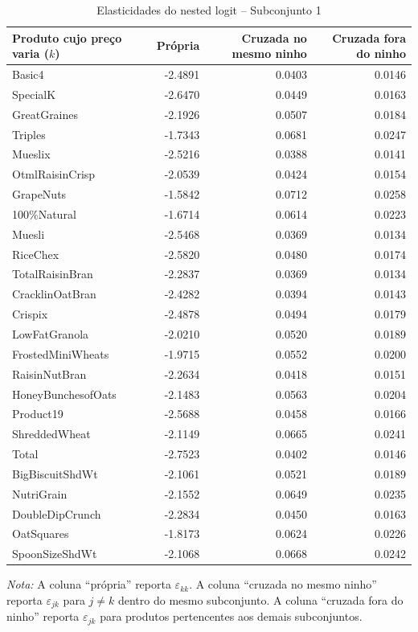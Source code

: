 \begingroup
\begin{table}[H]
\centering
\caption{Elasticidades do nested logit -- Subconjunto 1}
\label{tab:elas-nested-subset-1}
\scriptsize
\begin{tabular}{lrrr}
\toprule
Produto cujo preço varia ($k$) 
& Própria 
& Cruzada no mesmo ninho 
& Cruzada fora do ninho \\
\midrule
Basic4 & -2.4891 & 0.0403 & 0.0146 \\
SpecialK & -2.6470 & 0.0449 & 0.0163 \\
GreatGraines & -2.1926 & 0.0507 & 0.0184 \\
Triples & -1.7343 & 0.0681 & 0.0247 \\
Mueslix & -2.5216 & 0.0388 & 0.0141 \\
OtmlRaisinCrisp & -2.0539 & 0.0424 & 0.0154 \\
GrapeNuts & -1.5842 & 0.0712 & 0.0258 \\
100\%Natural & -1.6714 & 0.0614 & 0.0223 \\
Muesli & -2.5468 & 0.0369 & 0.0134 \\
RiceChex & -2.5820 & 0.0480 & 0.0174 \\
TotalRaisinBran & -2.2837 & 0.0369 & 0.0134 \\
CracklinOatBran & -2.4282 & 0.0394 & 0.0143 \\
Crispix & -2.4878 & 0.0494 & 0.0179 \\
LowFatGranola & -2.0210 & 0.0520 & 0.0189 \\
FrostedMiniWheats & -1.9715 & 0.0552 & 0.0200 \\
RaisinNutBran & -2.2634 & 0.0418 & 0.0151 \\
HoneyBunchesofOats & -2.1483 & 0.0563 & 0.0204 \\
Product19 & -2.5688 & 0.0458 & 0.0166 \\
ShreddedWheat & -2.1149 & 0.0665 & 0.0241 \\
Total & -2.7523 & 0.0402 & 0.0146 \\
BigBiscuitShdWt & -2.1061 & 0.0521 & 0.0189 \\
NutriGrain & -2.1552 & 0.0649 & 0.0235 \\
DoubleDipCrunch & -2.2834 & 0.0450 & 0.0163 \\
OatSquares & -1.8173 & 0.0624 & 0.0226 \\
SpoonSizeShdWt & -2.1068 & 0.0668 & 0.0242 \\
\bottomrule
\end{tabular}

\vspace{0.3em}
\footnotesize
\textit{Nota:} A coluna ``própria'' reporta $\varepsilon_{kk}$. A coluna ``cruzada no mesmo ninho'' reporta $\varepsilon_{jk}$ para $j \neq k$ dentro do mesmo subconjunto. A coluna ``cruzada fora do ninho'' reporta $\varepsilon_{jk}$ para produtos pertencentes aos demais subconjuntos.
\end{table}
\endgroup


